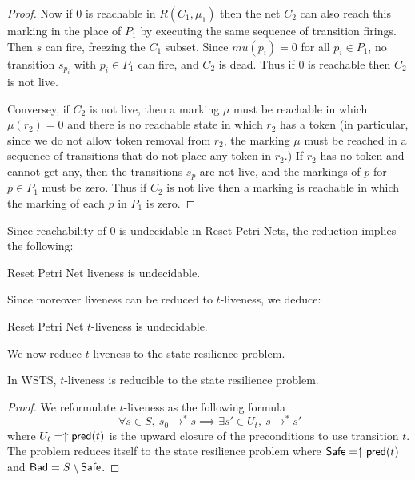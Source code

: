 \begin{proof}
Now if $0$ is reachable
in $R(C_1, \mu_1)$ 
then the net $C_2$ can also reach this marking
in the place of $P_1$ by executing the same sequence of transition firings.
Then $s$ can fire, freezing the $C_1$ subset.
Since $mu(p_i) = 0$ for all $p_i \in P_1$, no transition $s_{p_i}$ with $p_i \in P_1$ can fire, and $C_2$ is dead.
Thus if $0$ is reachable then $C_2$ is not live.

Conversey, if $C_2$ is not live, then a marking $\mu$ must be reachable in which 
$\mu(r_2) = 0$ and there is no reachable state in which $r_2$ has a token
(in particular, since we do not allow token removal from $r_2$, the marking $\mu$ must be reached in a sequence of transitions that do not place any token in $r_2$.)
If $r_2$ has no token and cannot get any, then the transitions $s_p$ are not live, and the markings of $p$ for $p \in P_1$ must be zero. 
Thus if $C_2$ is not live then a marking is reachable in which the marking of each $p$ in $P_1$ is zero. 

\end{proof}
\fi


Since reachability of $0$ is undecidable in Reset Petri-Nets, the reduction implies the following:

\begin{corollary}
Reset Petri Net liveness is undecidable.
\end{corollary}

Since moreover liveness can be reduced to 
$t$-liveness, we deduce:

\begin{corollary}
Reset Petri Net $t$-liveness is undecidable.
\end{corollary}

We now reduce $t$-liveness to the state resilience problem.

\begin{proposition}\label{reductions}
In WSTS, $t$-liveness is reducible to the state resilience problem.
\end{proposition}


\begin{proof}
We reformulate $t$-liveness as the following formula
$$ ~ \forall s \in S, ~ s_0 \rightarrow^* s \implies \exists s' \in U_t, ~ s \rightarrow^{*} s'$$  
where
$U_t=\uparrow \textsf{pred}(t)$
is the upward closure of the preconditions to use transition $t$.  
The problem reduces itself to the state resilience problem
where $\textsf{Safe} = \uparrow \textsf{pred}(t)$ and $\textsf{Bad} = S \setminus \textsf{Safe}$.

\end{proof}



